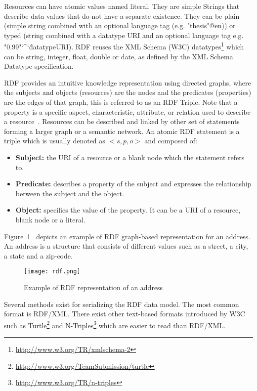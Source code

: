 Resources can have atomic values named literal. They are simple Strings that describe data values that do not have a separate existence. They can be plain (simple string combined with an optional language tag (e.g. "thesis"@en)) or typed (string combined with a datatype URI and an optional language tag e.g. "0.99"\char`\^\char`\^datatypeURI). RDF reuses the  XML Schema (W3C) datatypes\footnote{\url{http://www.w3.org/TR/xmlschema-2}} which can be string, integer, float, double or date, as defined by the XML Schema Datatype specification.

RDF provides an intuitive knowledge representation using directed graphs, where the subjects and objects (resources) are the nodes and the predicates (properties) are the edges of that graph, this is referred to as an RDF Triple. Note that a property is a specific aspect, characteristic, attribute, or relation used to describe a resource~\cite{Lassila:RDF:99}. Resources can be described and linked by other set of statements forming a larger graph or a semantic network. An atomic RDF statement is a triple which is usually denoted as $<s,p,o>$ and composed of:

\begin{itemize}
	\item \textbf{Subject:} the URI of a resource or a blank node which the statement refers to.
	\item \textbf{Predicate:} describes a property of the subject and expresses the relationship between the subject and the object.
	\item \textbf{Object:} specifies the value of the property. It can be a URI of a resource, blank node or a literal.
\end{itemize}

Figure~\ref{fig:rdfGraph}~ depicts an example of RDF graph-based representation for an address. An address is a structure that consists of different values such as a street, a city, a state and a zip-code.

\begin{figure}[htbp]
 \centering
\texttt{[image: rdf.png]}
\caption{Example of RDF representation of an address}
\label{fig:rdfGraph}
\end{figure}

Several methods exist for serializing the RDF data model. The most common format is RDF/XML. There exist other text-based formats introduced by W3C such as Turtle\footnote{\url{http://www.w3.org/TeamSubmission/turtle}} and N-Triples\footnote{\url{http://www.w3.org/TR/n-triples}} which are easier to read than RDF/XML.


